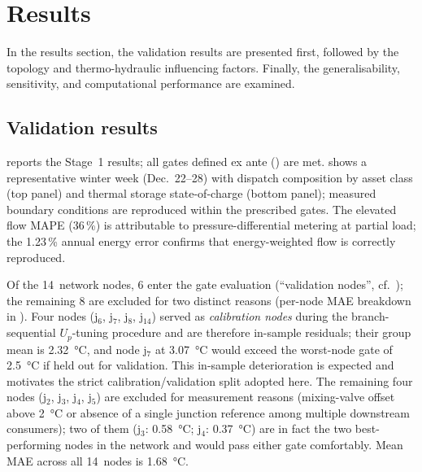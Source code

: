 \documentclass[a4paper,fleqn]{cas-dc}
\begin{document}
\section{Results}
\label{sec:results}
In the results section, the validation results are presented first, followed by the topology and thermo-hydraulic influencing factors. Finally, the generalisability, sensitivity, and computational performance are examined. 


\subsection{Validation results}
\label{sec:results_validation}

 reports the Stage~1 results; all gates
defined ex ante () are met.
 shows a representative winter week
(Dec.~22--28) with dispatch composition by asset class (top panel)
and thermal storage state-of-charge (bottom panel); measured
boundary conditions are reproduced within the prescribed gates.
The elevated flow MAPE (36\,\%) is attributable to
pressure-differential metering at partial load; the 1.23\,\%
annual energy error confirms that energy-weighted flow is correctly
reproduced.

Of the 14~network nodes, 6 enter the gate evaluation
(``validation nodes'', cf.\ ); the remaining
8 are excluded for two distinct reasons (per-node MAE breakdown in
). Four nodes (j$_6$, j$_7$, j$_8$,
j$_{14}$) served as \emph{calibration nodes} during the
branch-sequential $U_p$-tuning procedure and are therefore
in-sample residuals; their group mean is \SI{2.32}{\celsius}, and
node j$_7$ at \SI{3.07}{\celsius} would exceed the worst-node gate
of \SI{2.5}{\celsius} if held out for validation. This in-sample
deterioration is expected and motivates the strict
calibration/validation split adopted here. The remaining four nodes
(j$_2$, j$_3$, j$_4$, j$_5$) are excluded for measurement reasons
(mixing-valve offset above \SI{2}{\celsius} or absence of a single
junction reference among multiple downstream consumers); two of
them (j$_3$: \SI{0.58}{\celsius}; j$_4$: \SI{0.37}{\celsius}) are
in fact the two best-performing nodes in the network and would pass
either gate comfortably. Mean MAE across all 14~nodes is
\SI{1.68}{\celsius}.
\end{document}

